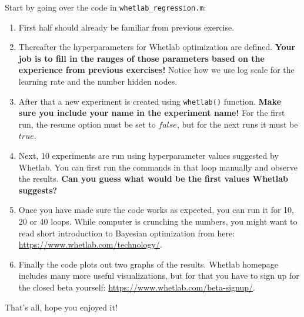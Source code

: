 \documentclass[a4paper,11pt]{article}
\begin{document}
 Start by going over the code in \texttt{whetlab\_regression.m}:

\begin{enumerate}
	\item First half should already be familiar from previous exercise.
	\item Thereafter the hyperparameters for Whetlab optimization are defined. \textbf{Your job is to fill in the ranges of those parameters based on the experience from previous exercises!} Notice how we use log scale for the learning rate and the number hidden nodes.
	\item After that a new experiment is created using \texttt{whetlab()} function. \textbf{Make sure you include your name in the experiment name!} For the first run, the resume option must be set to $false$, but for the next runs it must be $true$.
	\item Next, 10 experiments are run using hyperparameter values suggested by Whetlab. You can first run the commands in that loop manually and observe the results. \textbf{Can you guess what would be the first values Whetlab suggests?}
	\item Once you have made sure the code works as expected, you can run it for 10, 20 or 40 loops. While computer is crunching the numbers, you might want to read short introduction to Bayesian optimization from here: \url{https://www.whetlab.com/technology/}.
	\item Finally the code plots out two graphs of the results. Whetlab homepage includes many more useful visualizations, but for that you have to sign up for the closed beta yourself: \url{https://www.whetlab.com/beta-signup/}.
\end{enumerate}

That's all, hope you enjoyed it!
\end{document}
